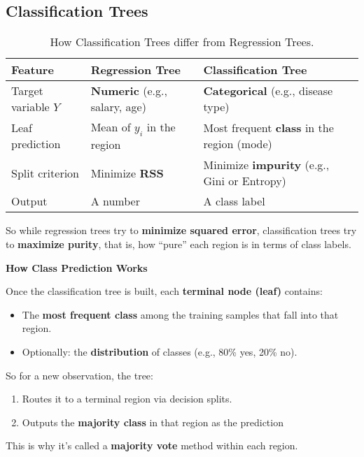 \subsection{Classification Trees}

\begin{table}[!htp]
    \centering
    \begin{adjustbox}{width={\textwidth},totalheight={\textheight},keepaspectratio}
        \begin{tabular}{@{} l l l @{}}
            \toprule
            Feature & \textbf{Regression Tree} & \textbf{Classification Tree} \\
            \midrule
            Target variable $Y$ & \textbf{Numeric} (e.g., salary, age)  & \textbf{Categorical} (e.g., disease type)                 \\ [.5em]
            Leaf prediction     & Mean of $y_i$ in the region           & Most frequent \textbf{class} in the region (mode)         \\ [.5em]
            Split criterion     & Minimize \textbf{RSS}                 & Minimize \textbf{impurity} (e.g., Gini or Entropy)        \\ [.5em]
            Output              & A number                              & A class label                                             \\
            \bottomrule
        \end{tabular}
    \end{adjustbox}
    \caption{How Classification Trees differ from Regression Trees.}
\end{table}

\noindent
So while regression trees try to \textbf{minimize squared error}, classification trees try to \textbf{maximize purity}, that is, how ``pure'' each region is in terms of class labels.

\highspace
\begin{flushleft}
    \textcolor{Green3}{ \textbf{How Class Prediction Works}}
\end{flushleft}
Once the classification tree is built, each \textbf{terminal node (leaf)} contains:
\begin{itemize}
    \item The \textbf{most frequent class} among the training samples that fall into that region.
    \item Optionally: the \textbf{distribution} of classes (e.g., 80\% yes, 20\% no).
\end{itemize}
So for a new observation, the tree:
\begin{enumerate}
    \item Routes it to a terminal region via decision splits.
    \item Outputs the \textbf{majority class} in that region as the prediction
\end{enumerate}
This is why it's called a \textbf{majority vote} method within each region.

